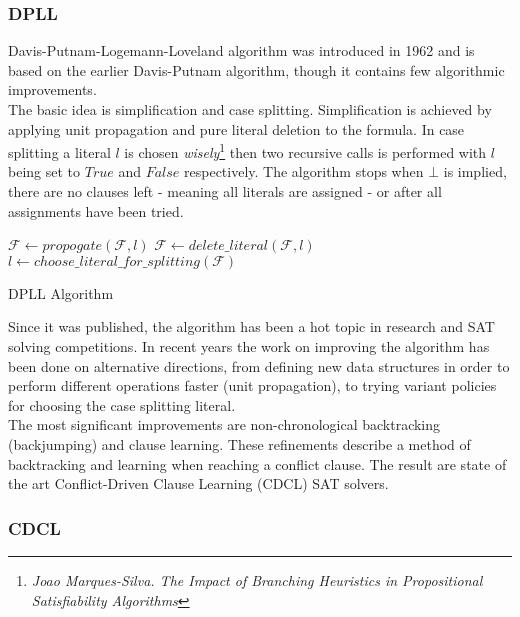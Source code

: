 \documentclass[]{article}
\begin{document}
	\subsubsection{DPLL}
	Davis-Putnam-Logemann-Loveland algorithm was introduced in 1962 and is based on the earlier Davis-Putnam algorithm, though it contains few algorithmic improvements. \\
	The basic idea is simplification and case splitting. Simplification is achieved by applying unit propagation and pure literal deletion to the formula. In case splitting a literal $ l $ is chosen \textit{wisely}\footnote{\textit{Joao Marques-Silva. The Impact of Branching Heuristics in Propositional Satisfiability Algorithms} } then two recursive calls is performed with $ l $ being set to $ True $ and $ False $ respectively. The algorithm stops when $ \bot $ is implied, there are no clauses left - meaning all literals are assigned - or after all assignments have been tried.
	\\
	\begin{algorithm}[H]
		 {
			$ \mathcal{F} \leftarrow propogate(\mathcal{F}, l) $
		}
		 {
			$ \mathcal{F} \leftarrow delete\_literal(\mathcal{F}, l) $
		}
		$ l \leftarrow choose\_literal\_for\_splitting(\mathcal{F}) $ \\
	\caption{DPLL Algorithm}
	\end{algorithm}
	Since it was published, the algorithm has been a hot topic in research and SAT solving competitions. In recent years the work on improving the algorithm has been done on alternative directions, from defining new data structures in order to perform different operations faster (unit propagation), to trying variant policies for choosing the case splitting literal.\\ The most significant improvements are non-chronological backtracking (backjumping) and clause learning. These refinements describe a method of backtracking and learning when reaching a conflict clause. The result are state of the art Conflict-Driven Clause Learning (CDCL) SAT solvers.

	\subsubsection{CDCL}
\end{document}
